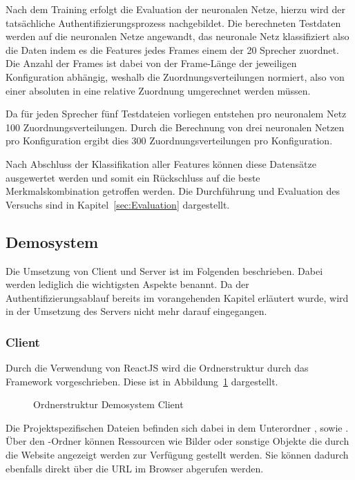 Nach dem Training erfolgt die Evaluation der neuronalen Netze, hierzu wird der tatsächliche Authentifizierungsprozess nachgebildet.
Die berechneten Testdaten werden auf die neuronalen Netze angewandt, das neuronale Netz klassifiziert also die Daten indem es die Features jedes Frames einem der 20 Sprecher zuordnet.
Die Anzahl der Frames ist dabei von der Frame-Länge der jeweiligen Konfiguration abhängig, weshalb die Zuordnungsverteilungen normiert, also von einer absoluten in eine relative Zuordnung umgerechnet werden müssen.

Da für jeden Sprecher fünf Testdateien vorliegen entstehen pro neuronalem Netz 100 Zuordnungsverteilungen.
Durch die Berechnung von drei neuronalen Netzen pro Konfiguration ergibt dies 300 Zuordnungsverteilungen pro Konfiguration.

Nach Abschluss der Klassifikation aller Features können diese Datensätze ausgewertet werden und somit ein Rückschluss auf die beste Merkmalskombination getroffen werden.
Die Durchführung und Evaluation des Versuchs sind in Kapitel~\ref{sec:Evaluation} dargestellt.

\subsection{Demosystem}
Die Umsetzung von Client und Server ist im Folgenden beschrieben.
Dabei werden lediglich die wichtigsten Aspekte benannt.
Da der Authentifizierungsablauf bereits im vorangehenden Kapitel erläutert wurde, wird in der Umsetzung des Servers nicht mehr darauf eingegangen.

\subsubsection{Client}
Durch die Verwendung von ReactJS wird die Ordnerstruktur durch das Framework vorgeschrieben.
Diese ist in Abbildung~\ref{fig:OrdnerstrukturClient} dargestellt.
\begin{figure}[H]
    \caption{Ordnerstruktur Demosystem Client}
    \label{fig:OrdnerstrukturClient}
\end{figure}
Die Projektspezifischen Dateien befinden sich dabei in dem Unterordner , sowie .
Über den -Ordner können Ressourcen wie Bilder oder sonstige Objekte die durch die Website angezeigt werden zur Verfügung gestellt werden.
Sie können dadurch ebenfalls direkt über die URL im Browser abgerufen werden.

